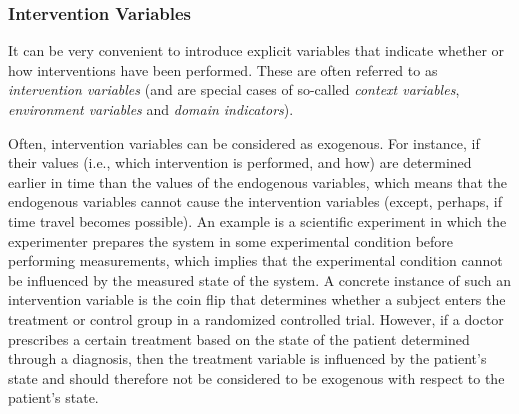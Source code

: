 \subsubsection{Intervention Variables}\label{sec:intervention_variables}

It can be very convenient to introduce explicit variables that indicate whether or how
interventions have been performed. These are often referred to as \emph{intervention variables}
(and are special cases of so-called \emph{context variables}, \emph{environment variables} and \emph{domain indicators}).

Often, intervention variables can be considered as exogenous. For instance, if their values (i.e., which intervention
is performed, and how) are determined earlier in time than the values of the endogenous variables, 
which means that the endogenous variables cannot cause the intervention variables (except, perhaps, if
time travel becomes possible). An
example is a scientific experiment in which the experimenter prepares the system in some 
experimental condition before performing measurements, which implies that the experimental condition 
cannot be influenced by the measured state of the system. 
A concrete instance of such an intervention variable is 
the coin flip that determines whether a subject enters the treatment or control group in a
randomized controlled trial. 
However, if a doctor prescribes a certain treatment based on 
the state of the patient determined through a diagnosis, then the treatment variable is 
influenced by the patient's state and should therefore not be considered to be exogenous with
respect to the patient's state.

